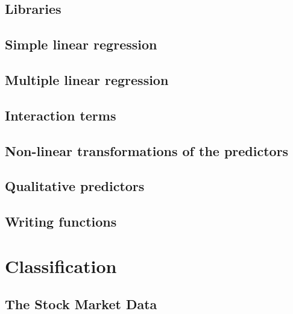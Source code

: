 \documentclass[
]{book}
\begin{document}
\hypertarget{libraries}{%
\section{Libraries}\label{libraries}}

\hypertarget{simple-linear-regression}{%
\section{Simple linear regression}\label{simple-linear-regression}}

\hypertarget{multiple-linear-regression}{%
\section{Multiple linear regression}\label{multiple-linear-regression}}

\hypertarget{interaction-terms}{%
\section{Interaction terms}\label{interaction-terms}}

\hypertarget{non-linear-transformations-of-the-predictors}{%
\section{Non-linear transformations of the predictors}\label{non-linear-transformations-of-the-predictors}}

\hypertarget{qualitative-predictors}{%
\section{Qualitative predictors}\label{qualitative-predictors}}

\hypertarget{writing-functions}{%
\section{Writing functions}\label{writing-functions}}

\hypertarget{classification}{%
\chapter{Classification}\label{classification}}

\hypertarget{the-stock-market-data}{%
\section{The Stock Market Data}\label{the-stock-market-data}}
\end{document}

